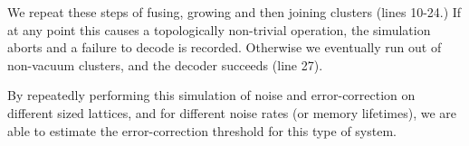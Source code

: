 \documentclass[aps, letterpaper, onecolumn, superscriptaddress, notitlepage, 10pt]{revtex4-1}
\begin{document}
We repeat these steps of fusing, growing and then joining clusters (lines 10-24.)
If at any point this causes a topologically 
non-trivial operation, the simulation aborts and a failure
to decode is recorded.
Otherwise we eventually run out
of non-vacuum clusters, and the decoder succeeds (line 27).

By repeatedly performing this simulation of noise and error-correction on different sized lattices, and for different noise rates (or memory lifetimes), we are able to estimate the error-correction threshold for this type of system.


%
%
%
%
%
%
%
\end{document}
